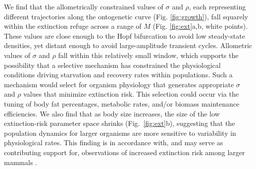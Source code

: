 \documentclass[twocolumn,preprintnumbers,amsmath,amssymb,superscriptaddress]{revtex4}
\begin{document}
\begin{bibunit}[unsrt]
  We find that the allometrically constrained values of $\sigma$ and $\rho$,
  each representing different trajectories along the ontogenetic curve
  (Fig. \ref{fig:growth}), fall squarely within the extinction refuge across a
  range of $M$ (Fig. \ref{fig:ext}a,b, white points). These values are close
  enough to the Hopf bifurcation to avoid low steady-state densities, yet
  distant enough to avoid large-amplitude transient cycles.  Allometric values
  of $\sigma$ and $\rho$ fall within this relatively small window, which
  supports the possibility that a selective mechanism has constrained the
  physiological conditions driving starvation and recovery rates within
  populations.  Such a mechanism would select for organism physiology that
  generates appropriate $\sigma$ and $\rho$ values that minimize extinction
  risk.  This selection could occur via the tuning of body fat percentages,
  metabolic rates, and/or biomass maintenance efficiencies.  We also find that
  as body size increases, the size of the low extinction-risk parameter space
  shrinks (Fig.~\ref{fig:ext}b), suggesting that the population dynamics for
  larger organisms are more sensitive to variability in physiological rates.
  This finding is in accordance with, and may serve as contributing support for, observations of increased extinction risk among larger mammals \cite{Liow:2008jx}.\\








\end{bibunit}
\end{document}
